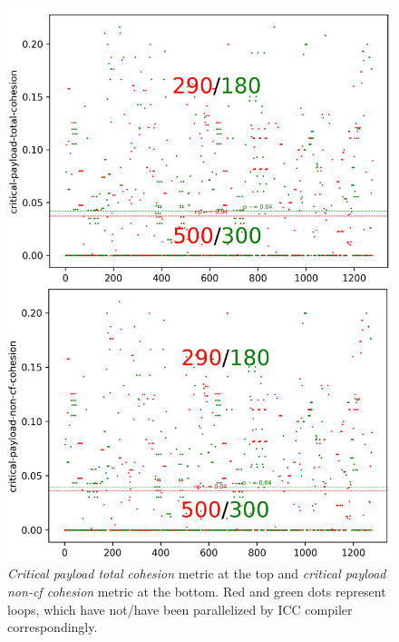 \begin{figure}[H]
\centering
\includegraphics[width=\linewidth]{figs/loop-cohesion-0.png}
\caption{\textit{Critical payload total cohesion} metric at the top and \textit{critical payload non-cf cohesion} metric at the bottom. Red and green dots represent loops, which have not/have been parallelized by ICC compiler correspondingly.}
\label{loop-cohesion-0}
\end{figure}

